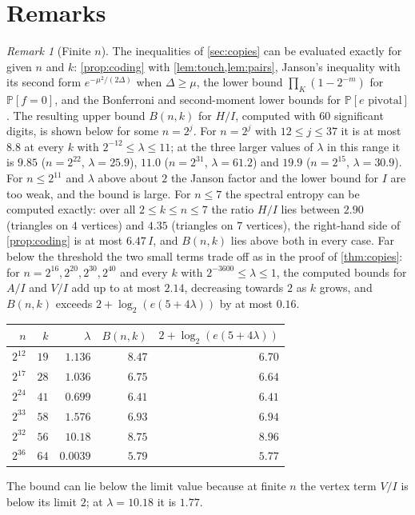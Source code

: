 \documentclass[11pt]{amsart}
\theoremstyle{remark}
\newtheorem{remark}[theorem]{Remark}
\renewcommand{\Pr}{\mathbb{P}}
\begin{document}
\section{Remarks}

\begin{remark}[Finite $n$]\label{rem:numerics}
The inequalities of \cref{sec:copies} can be evaluated exactly for given $n$ and $k$: \cref{prop:coding} with
\cref{lem:touch,lem:pairs}, Janson's inequality with its second form $e^{-\mu^2/(2\Delta)}$ when $\Delta\ge\mu$, the
lower bound $\prod_K(1-2^{-m})$ for $\Pr[f=0]$, and the Bonferroni and second-moment lower bounds for $\Pr[e\text{ pivotal}]$.
The resulting upper bound $B(n,k)$ for $H/I$, computed with $60$ significant digits, is shown below for some $n=2^j$.
For $n=2^j$ with $12\le j\le37$ it is at most $8.8$ at every $k$ with $2^{-12}\le\lambda\le11$; at the three larger
values of $\lambda$ in this range it is $9.85$ ($n=2^{22}$, $\lambda=25.9$), $11.0$ ($n=2^{31}$, $\lambda=61.2$) and
$19.9$ ($n=2^{15}$, $\lambda=30.9$). For $n\le2^{11}$ and $\lambda$ above about $2$ the Janson factor and the lower
bound for $I$ are too weak, and the bound is large. For $n\le7$ the spectral entropy can be computed exactly: over all
$2\le k\le n\le7$ the ratio $H/I$ lies between $2.90$ (triangles on $4$ vertices) and $4.35$ (triangles on $7$
vertices), the right-hand side of \cref{prop:coding} is at most $6.47\,I$, and $B(n,k)$ lies above both in every case.
Far below the threshold the two small terms trade off as in the proof of \cref{thm:copies}: for
$n=2^{16},2^{20},2^{30},2^{40}$ and every $k$ with $2^{-3600}\le\lambda\le1$, the computed bounds for $A/I$ and $V/I$
add up to at most $2.14$, decreasing towards $2$ as $k$ grows, and $B(n,k)$ exceeds $2+\log_2(e(5+4\lambda))$ by at
most $0.16$.
\begin{center}
\begin{tabular}{rrrrr}
\toprule
$n$ & $k$ & $\lambda$ & $B(n,k)$ & $2+\log_2(e(5+4\lambda))$\\
\midrule
$2^{12}$ & $19$ & $1.136$ & $8.47$ & $6.70$\\
$2^{17}$ & $28$ & $1.036$ & $6.75$ & $6.64$\\
$2^{24}$ & $41$ & $0.699$ & $6.41$ & $6.41$\\
$2^{33}$ & $58$ & $1.576$ & $6.93$ & $6.94$\\
$2^{32}$ & $56$ & $10.18$ & $8.75$ & $8.96$\\
$2^{36}$ & $64$ & $0.0039$ & $5.79$ & $5.77$\\
\bottomrule
\end{tabular}
\end{center}
The bound can lie below the limit value because at finite $n$ the vertex term $V/I$ is below its limit $2$; at
$\lambda=10.18$ it is $1.77$.
\end{remark}
\end{document}
